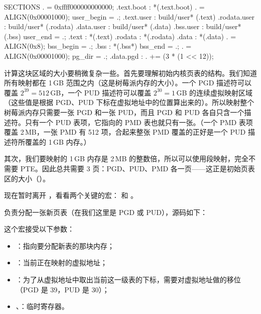 \begin{txtcode}
SECTIONS
{
	. = 0xffff000000000000;
	.text.boot : { *(.text.boot) }
	. = ALIGN(0x00001000);
	user_begin = .;
	.text.user : { build/user* (.text) }
	.rodata.user : { build/user* (.rodata) }
	.data.user : { build/user* (.data) }
	.bss.user : { build/user* (.bss) }
	user_end = .;
	.text :  { *(.text) }
	.rodata : { *(.rodata) }
	.data : { *(.data) }
	. = ALIGN(0x8);
	bss_begin = .;
	.bss : { *(.bss*) }
	bss_end = .;
	. = ALIGN(0x00001000);
	pg_dir = .;
	.data.pgd : { . += (3 * (1 << 12)); }
}
\end{txtcode}

计算这块区域的大小要稍微复杂一些。首先要理解初始内核页表的结构。我们知道所有映射都在 1\,GB 范围之内（这是树莓派内存的大小）。一个 PGD 描述符可以覆盖 $2^{39} = 512$\,GB，一个 PUD 描述符可以覆盖 $2^{30} = 1$\,GB 的连续虚拟映射区域（这些值是根据 PGD、PUD 下标在虚拟地址中的位置算出来的）。所以映射整个树莓派内存只需要一张 PGD 和一张 PUD，而且 PGD 和 PUD 各自只含一个描述符。只有一个 PUD 表项，它指向的 PMD 表也就只有一张。（一个 PMD 表项覆盖 2\,MB，一张 PMD 有 512 项，合起来整张 PMD 覆盖的正好是一个 PUD 描述符所覆盖的 1\,GB 内存。）

其次，我们要映射的 1\,GB 内存是 2\,MB 的整数倍，所以可以使用段映射，完全不需要 PTE。因此总共需要 3 页：PGD、PUD、PMD 各一页——这正是初始页表区的大小（）。

现在暂时离开 ，看看两个关键的宏： 和 。

 负责分配一张新页表（在我们这里是 PGD 或 PUD），源码如下：


这个宏接受以下参数：

\begin{itemize}
  \item {}：指向要分配新表的那块内存；
  \item {}：当前正在映射的虚拟地址；
  \item {}：为了从虚拟地址中取出当前这一级表的下标，需要对虚拟地址做的移位（PGD 是 39，PUD 是 30）；
  \item {}、：临时寄存器。
\end{itemize}

